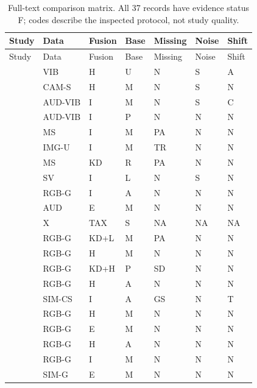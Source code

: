 \begin{longtable}{@{}p{}llllll@{}}
\caption[Full-text literature comparison matrix]{Full-text comparison matrix. All 37 records have evidence status F; codes describe the inspected protocol, not study quality.}\label{tab:literature-matrix}\\
\toprule Study & Data & Fusion & Base & Missing & Noise & Shift \\
\midrule\endfirsthead
\toprule Study & Data & Fusion & Base & Missing & Noise & Shift \\
\midrule\endhead
\citep{Wang2025A} & VIB & H & U & N & S & A \\
\citep{Ying2025Trustworthy} & CAM-S & H & M & N & S & N \\
\citep{Huang2026Rolling} & AUD-VIB & I & M & N & S & C \\
\citep{Gu2024Improved} & AUD-VIB & I & P & N & N & N \\
\citep{Yang2024Fault} & MS & I & M & PA & N & N \\
\citep{Ma2025A} & IMG-U & I & M & TR & N & N \\
\citep{Li2025PGMTKD} & MS & KD & R & PA & N & N \\
\citep{AlDulaimi2019A} & SV & I & L & N & S & N \\
\citep{Li2025MADFlow} & RGB-G & I & A & N & N & N \\
\citep{Wan2024Pipeline} & AUD & E & M & N & N & N \\
\citep{Baltrusaitis2019Multimodal} & X & TAX & S & NA & NA & NA \\
\citep{Sui2026Incomplete} & RGB-G & KD+L & M & PA & N & N \\
\citep{Cheng2025Multimodal} & RGB-G & H & M & N & N & N \\
\citep{Xu2025ModalityResilient} & RGB-G & KD+H & P & SD & N & N \\
\citep{Shangguan2025CPIR} & RGB-G & H & A & N & N & N \\
\citep{Altinses2025Performance} & SIM-CS & I & A & GS & N & T \\
\citep{Wang2023Multimodal} & RGB-G & H & M & N & N & N \\
\citep{Horwitz2023Back} & RGB-G & E & M & N & N & N \\
\citep{Costanzino2024Multimodal} & RGB-G & H & A & N & N & N \\
\citep{Rudolph2023Asymmetric} & RGB-G & I & M & N & N & N \\
\citep{Bonfiglioli2023The} & SIM-G & E & M & N & N & N \\

\end{longtable}
